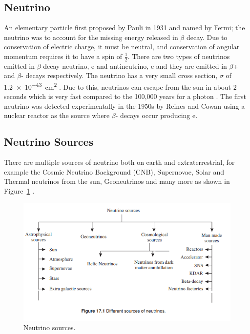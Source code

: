 \subsection{Neutrino}

An elementary particle first proposed by Pauli in 1931 and named by Fermi; the neutrino was to account for the missing energy released in $\beta$ decay. Due to conservation of electric charge, it must be neutral, and conservation of angular momentum requires it to have a spin of $\frac{1}{2}$. There are two types of neutrinos emitted in $\beta$ decay neutrino, e and antineutrino, e and they are emitted in $\beta$+ and $\beta$- decays respectively. The neutrino has a very small cross section, $\sigma$ of \SI{1.2e-43}{\centi\meter\squared} . Due to this, neutrinos can escape from the sun in about 2 seconds which is very fast compared to the 100,000 years for a photon . The first neutrino was detected experimentally in the 1950s by Reines and Cowan using a nuclear reactor as the source where $\beta$- decays occur producing e.

\subsection{Neutrino Sources}
There are multiple sources of neutrino both on earth and extraterrestrial, for example the Cosmic Neutrino Background (CNB), Supernovae, Solar and Thermal neutrinos from the sun, Geoneutrinos and many more as shown in Figure~\ref{fig:Nsource} . 
\begin{figure}[H]
	\centering
	\includegraphics[width=\textwidth]{assets/NeutrinoSourcesSajjad.png}
	\caption{Neutrino sources.}
	\label{fig:Nsource}
\end{figure}

